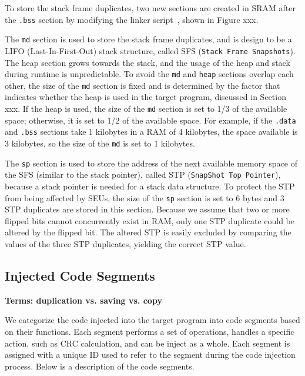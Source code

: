 To store the stack frame duplicates, two new sections are created in SRAM after the \texttt{.bss} section by modifying the linker script~\cite{linkerscript}, shown in Figure xxx. 

The \texttt{md} section is used to store the stack frame duplicates, and is design to be a LIFO (Last-In-First-Out) stack structure, called SFS (\texttt{Stack Frame Snapshots}). The heap section grows towards the stack, and the usage of the heap and stack during runtime is unpredictable. To avoid the \texttt{md} and \texttt{heap} sections overlap each other, the size of the \texttt{md} section is fixed and is determined by the factor that indicates whether the heap is used in the target program, discussed in Section xxx. If the heap is used, the size of the \texttt{md} section is set to 1/3 of the available space; otherwise, it is set to 1/2 of the available space. For example, if the \texttt{.data} and \texttt{.bss} sections take 1 kilobytes in a RAM of 4 kilobytes, the space available is 3 kilobytes, so the size of the \texttt{md} is set to 1 kilobytes.

The \texttt{sp} section is used to store the address of the next available memory space of the SFS (similar to the stack pointer), called STP (\texttt{SnapShot Top Pointer}), because a stack pointer is needed for a stack data structure. To protect the STP from being affected by SEUs, the size of the \texttt{sp} section is set to 6 bytes and 3 STP duplicates are stored in this section. Because we assume that two or more flipped bits cannot concurrently exist in RAM, only one STP duplicate could be altered by the flipped bit. The altered STP is easily excluded by comparing the values of the three STP duplicates, yielding the correct STP value.


\subsection{Injected Code Segments}

\textbf{Terms: duplication vs. saving vs. copy}

We categorize the code injected into the target program into code segments based on their functions. Each segment performs a set of operations, handles a specific action, such as CRC calculation, and can be inject as a whole. Each segment is assigned with a unique ID used to refer to the segment during the code injection process. Below is a description of the code segments.

